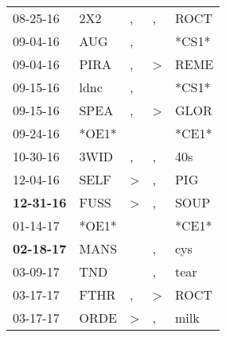 \begin{supertabular}{p{0.07\textwidth}p{0.06\textwidth}p{0.02\textwidth}p{0.02\textwidth}p{0.06\textwidth}}
          08-25-16\textsuperscript{} &            2X2\textsuperscript{} &                , &                , &           ROCT\textsuperscript{} \\
          09-04-16\textsuperscript{} &            AUG\textsuperscript{} &                , &                  &                            *CS1* \\
          09-04-16\textsuperscript{} &           PIRA\textsuperscript{} &                , &     \textgreater &           REME\textsuperscript{} \\
          09-15-16\textsuperscript{} &           ldnc\textsuperscript{} &                , &                  &                            *CS1* \\
          09-15-16\textsuperscript{} &           SPEA\textsuperscript{} &                , &     \textgreater &           GLOR\textsuperscript{} \\
          09-24-16\textsuperscript{} &                            *OE1* &                  &                  &                            *CE1* \\
          10-30-16\textsuperscript{} &           3WID\textsuperscript{} &                , &                , &            40s\textsuperscript{} \\
          12-04-16\textsuperscript{} &           SELF\textsuperscript{} &     \textgreater &                , &            PIG\textsuperscript{} \\
 \textbf{12-31-16\textsuperscript{}} &           FUSS\textsuperscript{} &     \textgreater &                , &           SOUP\textsuperscript{} \\
          01-14-17\textsuperscript{} &                            *OE1* &                  &                  &                            *CE1* \\
 \textbf{02-18-17\textsuperscript{}} &           MANS\textsuperscript{} &                  &                , &            cys\textsuperscript{} \\
          03-09-17\textsuperscript{} &            TND\textsuperscript{} &                  &                , &           tear\textsuperscript{} \\
          03-17-17\textsuperscript{} &           FTHR\textsuperscript{} &                , &     \textgreater &           ROCT\textsuperscript{} \\
          03-17-17\textsuperscript{} &           ORDE\textsuperscript{} &     \textgreater &                , &           milk\textsuperscript{} \\

\end{supertabular}
